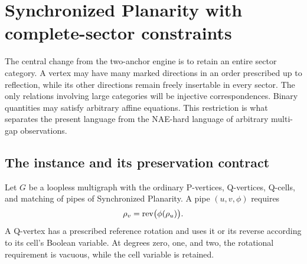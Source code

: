 \section{Synchronized Planarity with complete-sector constraints}
\label{cse:section}

The central change from the two-anchor engine is to retain an entire sector
category. A vertex may have many marked directions in an order prescribed
up to reflection, while its other directions remain freely insertable in
every sector. The only relations involving large categories will be
injective correspondences. Binary quantities may satisfy arbitrary affine
equations. This restriction is what separates the present language from
the NAE-hard language of arbitrary multi-gap observations.

\subsection{The instance and its preservation contract}

Let $G$ be a loopless multigraph with the ordinary P-vertices, Q-vertices,
Q-cells, and matching of pipes of Synchronized Planarity. A pipe
$(u,v,\phi)$ requires
\[
 \rho_v=\operatorname{rev}\bigl(\phi(\rho_u)\bigr).
\]
A Q-vertex has a prescribed reference rotation and uses it or its reverse
according to its cell's Boolean variable. At degrees zero, one, and two,
the rotational requirement is vacuous, while the cell variable is retained.

